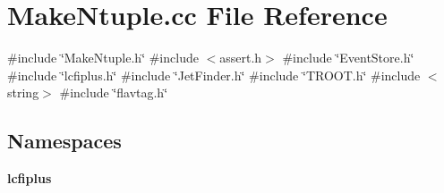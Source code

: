 \section{Make\+Ntuple.\+cc File Reference}
\label{MakeNtuple_8cc}
{\ttfamily \#include \char`\"{}Make\+Ntuple.\+h\char`\"{}}\newline
{\ttfamily \#include $<$assert.\+h$>$}\newline
{\ttfamily \#include \char`\"{}Event\+Store.\+h\char`\"{}}\newline
{\ttfamily \#include \char`\"{}lcfiplus.\+h\char`\"{}}\newline
{\ttfamily \#include \char`\"{}Jet\+Finder.\+h\char`\"{}}\newline
{\ttfamily \#include \char`\"{}T\+R\+O\+O\+T.\+h\char`\"{}}\newline
{\ttfamily \#include $<$string$>$}\newline
{\ttfamily \#include \char`\"{}flavtag.\+h\char`\"{}}\newline
\subsection*{Namespaces}
\begin{DoxyCompactItemize}
\item 
 \textbf{ lcfiplus}
\end{DoxyCompactItemize}
